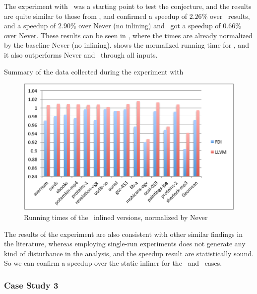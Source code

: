 The experiment with \gzip\ was a starting point to test the conjecture, and the results are quite similar to those from \bzip, and confirmed a speedup of $2.26 \%$ over \llvm\ results, and a speedup of $2.90 \%$ over Never (no inlining) and \llvm\ got a speedup of $0.66 \%$ over Never. These results can be seen in , where the times are already normalized by the baseline Never (no inlining).  shows the normalized running time for \gzip, and it also outperforms Never and \llvm\ through all inputs.

\begin{table}
  \centering
  \begin{tiny}
  
  \end{tiny}
  \caption{Summary of the data collected during the experiment with \gzip}
  \label{tab:speedupz}
\end{table}

\begin{figure}
  \centering
  \includegraphics[width=1.00\linewidth]{Figures/speedupgzipall}
  \caption{Running times of the \gzip\ inlined versions, normalized by Never}
  \label{fig:speedupz}
\end{figure}

The results of the experiment are also consistent with other similar findings in the literature, whereas employing single-run experiments does not generate any kind of disturbance in the analysis, and the speedup result are statistically sound. So we can confirm a speedup over the static inliner for the \bzip\ and \gzip\ cases.

\subsubsection{Case Study 3 \gobmk}

